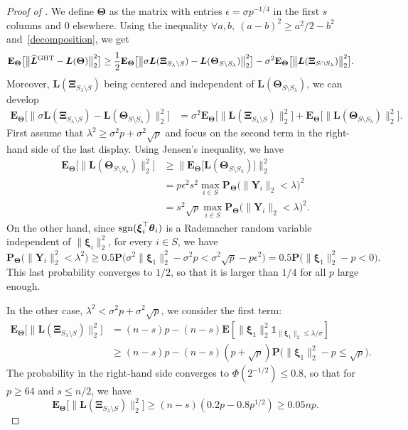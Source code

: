 \documentclass[sts,preprint,reqno,a4paper]{imsart}
\def\e{\epsilon}
\def\l{\lambda}
\def\bxi{\boldsymbol\xi}
\def\bXi{\boldsymbol\Xi}
\def\btheta{\boldsymbol\theta}
\def\bTheta{\boldsymbol\Theta}
\def\bY{\boldsymbol Y\!}
\def\bL{\boldsymbol L}
\def\bfT{\mathbf\Theta}
\def\fcar{\mathds{1}}
\def\esp{\mathbf E}
\def\prob{\mathbf P}
\def\hat{\widehat}
\def\sgn{{\rm sgn}}
\theoremstyle{plain}
\theoremstyle{remark}
\theoremstyle{definition}
\begin{document}
\begin{proof}[Proof of ]
	We define $\bfT$ as the matrix with entries $\e=\sigma p^{-1/4}$ in the first $s$ 
	columns and $0$ elsewhere. Using the inequality 
	$\forall a,b,~(a-b)^2\ge a^2/2-b^2$ and~\eqref{decomposition}, we get
	\begin{align}
	\esp_\bfT \big[\big\| \hat{\bL}{}^{\rm GHT}-\bL(\bfT) \big\|_2^2 \big]
			&\ge \frac12 \esp_\bfT \big[\big\| \sigma\bL(\bXi_{S_\l\setminus S}) -
			\bL(\bTheta_{S\setminus S_\lambda})\big\|_2^2\big] - \sigma^2\esp_\bfT 
			\big[\big\| \bL(\bXi_{S\cap S_\lambda}) \big\|_2^2\big].
	\end{align}
	Moreover, $\bL(\bXi_{S_\l\setminus S})$ being centered and independent of 
	$\bL(\bTheta_{S\setminus S_\lambda})$, we can develop 
	\begin{align}\label{decomposition_preuve_lowerboundHT}
	\esp_\bfT \big[\big\| \sigma\bL(\bXi_{S_\l\setminus S}) -
			\bL(\bTheta_{S\setminus S_\lambda})\big\|_2^2\big] &= 
			\sigma^2\esp_\bfT \big[\big\|  \bL(\bXi_{S_\l\setminus S})\big\|_2^2\big] +
			\esp_\bfT \big[\big\| \bL(\bTheta_{S\setminus S_\lambda})\big\|_2^2\big].
	\end{align}
	First assume that $\lambda^2\ge \sigma^2 p + \sigma^2\sqrt{p}$ and focus on the second term in 
	the right-hand side of the last display. Using Jensen's inequality, we have
	\begin{align}
	\esp_\bfT \big[\big\| \bL(\bTheta_{S\setminus S_\lambda})\big\|_2^2\big]
	&\ge \big\| \esp_\bfT \big[\bL(\bTheta_{S\setminus S_\lambda})\big]\big\|_2^2\\
	&=	p\e^2s^2 \max_{i\in S}\prob_\bfT\big(\|\bY_i\|_2<\l\big)^2\\
	&= s^2\sqrt{p}\max_{i\in S} \prob_\bfT\big(\|\bY_i\|_2<\l\big)^2.
	\end{align}
  On the other hand, since  $\sgn(\bxi_i^\top\btheta_i)$ 
	is a Rademacher random variable independent of $\|\bxi_i\|_2^2$, for every $i\in S$, 
	we have
	\begin{equation}
	\prob_\bfT\big(\|\bY_i\|_2^2<\lambda^2\big) 
		\ge 0.5\prob\big(\sigma^2\|\bxi_1\|_2^2-\sigma^2p<\sigma^2\sqrt{p}-p\e^2\big) 
		= 0.5\prob\big(\|\bxi_1\|_2^2-p<0\big).
	\end{equation}
	This last probability converges to $1/2$, so that it is larger than 
	$1/4$ for all $p$ large enough.
	
	In the other case, $\lambda^2< \sigma^2 p + \sigma^2\sqrt{p}$, we consider the first term:
	\begin{align}
	\esp_\bfT \big[\big\|  \bL(\bXi_{S_\l\setminus S})\big\|_2^2\big] 
		&= (n-s)p - (n-s)\esp [\|\bxi_1\|_2^2 \fcar_{\|\bxi_1\|_2\le\l/\sigma}] \\
		&\ge (n-s)p - (n-s)(p+\sqrt{p}) \prob\big(\|\bxi_1\|_2^2-p\le\sqrt{p}\big).
	\end{align}
	The probability in the right-hand side converges to $\Phi(2^{-1/2})\le 0.8$, 
	so that for $p\ge 64$ and $s\le n/2$, we have
	\begin{equation}
	\esp_\bfT \big[\big\|  \bL(\bXi_{S_\l\setminus S})\big\|_2^2\big] 
	\ge (n-s) (0.2p-0.8p^{1/2}) \ge 0.05 np.
	\end{equation}
	

\end{proof}
\end{document}

